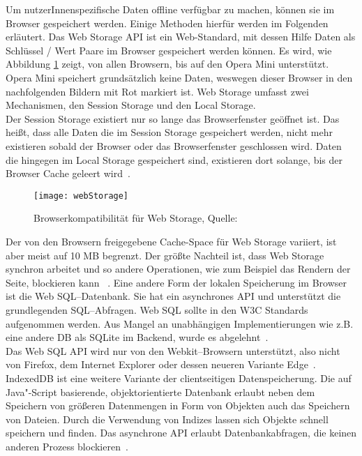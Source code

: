 Um nutzerInnenspezifische Daten offline verfügbar zu machen, können sie im Browser gespeichert werden. Einige Methoden hierfür werden im Folgenden erläutert.
%
Das Web Storage \gls{API} ist ein Web-Standard, mit dessen Hilfe Daten als Schlüssel / Wert Paare im Browser gespeichert werden können. Es wird, wie Abbildung \ref{fig:webStorage} zeigt, von allen Browsern, bis auf den Opera Mini unterstützt. Opera Mini speichert grundsätzlich keine Daten, weswegen dieser Browser in den nachfolgenden Bildern mit Rot markiert ist.
Web Storage umfasst zwei Mechanismen, den Session Storage und den Local Storage.\\
Der Session Storage existiert nur so lange das Browserfenster geöffnet ist.
Das heißt, dass alle Daten die im Session Storage gespeichert werden, nicht mehr existieren sobald der Browser oder das Browserfenster geschlossen wird.
Daten die hingegen im Local Storage gespeichert sind, existieren dort solange, bis der Browser Cache geleert wird~\cite{webstorage}.
\begin{figure}[H]
	\centering
	\texttt{[image: webStorage]}
	\grayRule
	\caption[Browserkompatibilität für Web Storage]{Browserkompatibilität für Web Storage, Quelle: ~\cite{caniuse-ws}}
	\label{fig:webStorage}
\end{figure}
Der von den Browsern freigegebene Cache-Space für Web Storage variiert, ist aber meist auf 10 MB begrenzt.
Der größte Nachteil ist, dass Web Storage synchron arbeitet und so andere Operationen, wie zum Beispiel das Rendern der Seite, blockieren kann ~\cite{webstorage-con}.
%
%
Eine andere Form der lokalen Speicherung im Browser ist die Web SQL--Datenbank.
Sie hat ein asynchrones \gls{API} und unterstützt die grundlegenden SQL--Abfragen. Web SQL sollte in den W3C Standards aufgenommen werden. Aus Mangel an unabhängigen Implementierungen wie z.B. eine andere \gls{DB} als SQLite im Backend, wurde es abgelehnt~\cite{websql}.\\
Das Web SQL \gls{API} wird nur von den Webkit--Browsern unterstützt, also nicht von Firefox, dem Internet Explorer oder dessen neueren Variante Edge~\cite{caniuse-websql}.
%
%
IndexedDB ist eine weitere Variante der clientseitigen Datenspeicherung. Die auf Java"-Script basierende, objektorientierte Datenbank erlaubt neben dem Speichern von größeren Datenmengen in Form von Objekten auch das Speichern von Dateien. Durch die Verwendung von Indizes lassen sich Objekte schnell speichern und finden. Das asynchrone \gls{API} erlaubt Datenbankabfragen, die keinen anderen Prozess blockieren~\cite{idb}.
